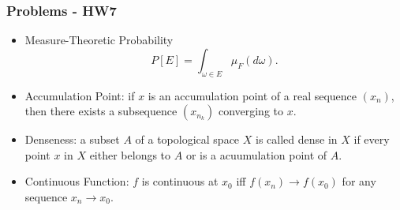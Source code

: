 \documentclass[serif,mathserif,professionalfont]{beamer}
\begin{document}
\begin{frame}
	
	\frametitle{Problems - HW7}
	
	\begin{itemize}
		\item Measure-Theoretic Probability
		\begin{equation*}
		P\left[E \right] = \int_{\omega \in E} \mu_F\left(d \omega \right).
		\end{equation*}
		\item Accumulation Point: if $ x $ is an accumulation point of a real sequence $ \left(x_n \right) $, then there exists a subsequence $ \left(x_{n_k} \right) $ converging to $ x $.
		\item Denseness: a subset $ A $ of a topological space $ X $ is called dense in $ X $ if every point $ x $ in $ X $ either belongs to $ A $ or is a acuumulation point of $ A $.
		\item Continuous Function: $ f $ is continuous at $ x_0 $ iff $ f\left(x_n \right) \to f\left(x_0 \right) $ for any sequence $ x_n \to x_0 $.
	\end{itemize}
	
	
	
\end{frame}







%	
%	
%	
%	








\end{document}
